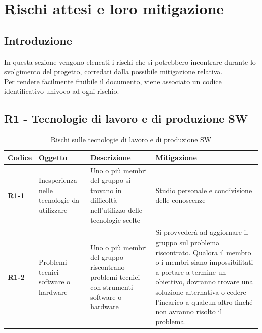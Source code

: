 \documentclass[a4paper,12pt]{article}
\begin{document}
\newpage
\section{Rischi attesi e loro mitigazione}
\label{sec:rischi}
    \subsection{Introduzione}
        In questa sezione vengono elencati i rischi che si potrebbero incontrare durante lo svolgimento del progetto, corredati dalla possibile mitigazione relativa.\\
        Per rendere facilmente fruibile il documento, viene associato un codice identificativo univoco ad ogni rischio.
    \subsection{R1 - Tecnologie di lavoro e di produzione SW}
        \begin{table}[H]
        \caption{Rischi sulle tecnologie di lavoro e di produzione SW}
        \label{tab:r1} 
            \begin{tabularx}{\textwidth}{|l|L|L|L|}
            \hline
            \textbf{Codice} & \textbf{Oggetto} & \textbf{Descrizione} & \textbf{Mitigazione}\\
            \hline
            \textbf{R1-1} & Inesperienza nelle tecnologie da utilizzare & Uno o più membri del gruppo si trovano in difficoltà nell'utilizzo delle tecnologie scelte & Studio personale e condivisione delle conoscenze\\
            \hline
            \textbf{R1-2} & Problemi tecnici software o hardware & Uno o più membri del gruppo riscontrano problemi tecnici con strumenti software o hardware & Si provvederà ad aggiornare il gruppo sul problema riscontrato. Qualora il membro o i membri siano impossibilitati a portare a termine un obiettivo, dovranno trovare una soluzione alternativa o cedere l'incarico a qualcun altro finché non avranno risolto il problema.\\            
            \hline
            \end{tabularx}
        \end{table}
        
\end{document}
